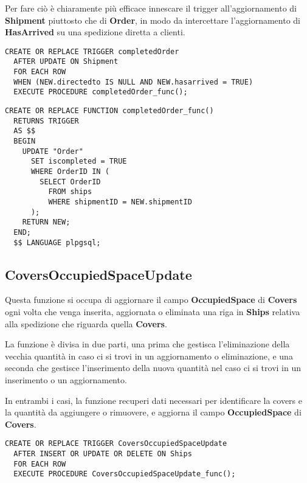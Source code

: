 Per fare ciò è chiaramente più efficace innescare il trigger all'aggiornamento di \textbf{Shipment} piuttosto che di \textbf{Order}, in modo da intercettare l'aggiornamento di \textbf{HasArrived} su una spedizione diretta a clienti.

\begin{lstlisting}[caption={Trigger per implementare \textbf{completedOrder}}]
  CREATE OR REPLACE TRIGGER completedOrder
  AFTER UPDATE ON Shipment
  FOR EACH ROW
  WHEN (NEW.directedto IS NULL AND NEW.hasarrived = TRUE)
  EXECUTE PROCEDURE completedOrder_func();
\end{lstlisting}

\begin{lstlisting}[caption={Funzione \textbf{completedOrder}}]
  CREATE OR REPLACE FUNCTION completedOrder_func()
  RETURNS TRIGGER
  AS $$
  BEGIN
    UPDATE "Order" 
      SET iscompleted = TRUE 
      WHERE OrderID IN (
        SELECT OrderID 
          FROM ships 
          WHERE shipmentID = NEW.shipmentID
      );
    RETURN NEW;
  END;
  $$ LANGUAGE plpgsql;
\end{lstlisting}

\subsection{\textbf{CoversOccupiedSpaceUpdate}}

Questa funzione si occupa di aggiornare il campo \textbf{OccupiedSpace} di \textbf{Covers} ogni volta che venga inserita, aggiornata o eliminata una riga in \textbf{Ships} relativa alla spedizione che riguarda quella \textbf{Covers}.

La funzione è divisa in due parti, una prima che gestisca l'eliminazione della vecchia quantità in caso ci si trovi in un aggiornamento o eliminazione, e una seconda che gestisce l'inserimento della nuova quantità nel caso ci si trovi in un inserimento o un aggiornamento.

In entrambi i casi, la funzione recuperi dati necessari per identificare la covers e la quantità da aggiungere o rimuovere, e aggiorna il campo \textbf{OccupiedSpace} di \textbf{Covers}.

\begin{lstlisting}[caption={Trigger per implementare \textbf{CoversOccupiedSpaceUpdate}}]
  CREATE OR REPLACE TRIGGER CoversOccupiedSpaceUpdate
  AFTER INSERT OR UPDATE OR DELETE ON Ships
  FOR EACH ROW
  EXECUTE PROCEDURE CoversOccupiedSpaceUpdate_func();
\end{lstlisting}

